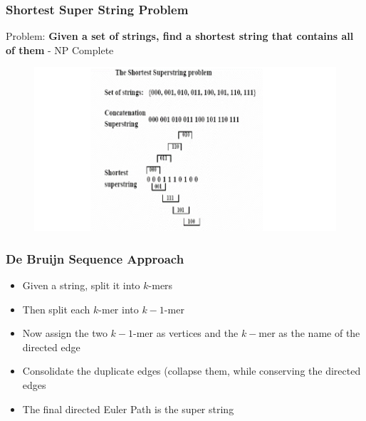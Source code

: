 \documentclass{beamer}
\begin{document}

\begin{frame}
\frametitle{Shortest Super String Problem}
Problem: \textbf{Given a set of strings, find a shortest string that contains all of them} - NP Complete
\begin{figure}[h]
\includegraphics[scale = 0.4]{ssexample.png}
\end{figure}
\end{frame}


\begin{frame}
\frametitle{De Bruijn Sequence Approach}
\begin{itemize}
\item Given a string, split it into $k$-mers
\pause
\item Then split each $k$-mer into $k-1$-mer
\pause
\item Now assign the two $k-1$-mer as vertices and the $k-$mer as the name of the directed edge
\pause
\item Consolidate the duplicate edges (collapse them, while conserving the directed edges
\pause
\item The final directed Euler Path is the super string
\end{itemize}
\end{frame}

\end{document}
